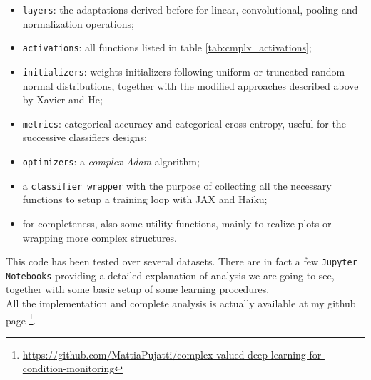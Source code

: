 \documentclass[../main.tex]{subfiles}
\begin{document}
\begin{itemize}
	\item \texttt{layers}: the adaptations derived before for linear, convolutional, pooling and normalization operations;
	\item \texttt{activations}: all functions listed in table \ref{tab:cmplx_activations};
	\item \texttt{initializers}: weights initializers following uniform or truncated random normal distributions, together with the modified approaches described above by Xavier and He;
	\item \texttt{metrics}: categorical accuracy and categorical cross-entropy, useful for the successive classifiers designs; 
	\item \texttt{optimizers}: a \textit{complex-Adam} algorithm;
	\item a \texttt{classifier wrapper} with the purpose of collecting all the necessary functions to setup a training loop with JAX and Haiku;
	\item for completeness, also some utility functions, mainly to realize plots or wrapping more complex structures. 
\end{itemize}
This code has been tested over several datasets. There are in fact a few \texttt{Jupyter Notebooks} providing a detailed explanation of analysis we are going to see, together with some basic setup of some learning procedures.\\
All the implementation and complete analysis is actually available at my github page \footnote{\href{https://github.com/MattiaPujatti/complex-valued-deep-learning-for-condition-monitoring}{https://github.com/MattiaPujatti/complex-valued-deep-learning-for-condition-monitoring}}.
\end{document}
